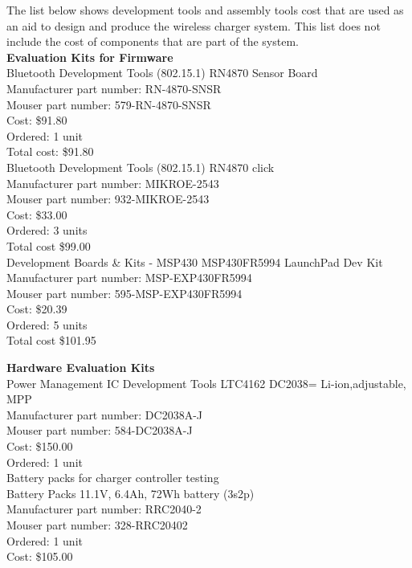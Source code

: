 \documentclass[12pt]{article}
\begin{document}
\indent \indent
The list below shows development tools and assembly tools cost that are used as an aid to design and produce the wireless charger system. This list does not include the cost of components that are part of the system.\\

\noindent
\textbf{Evaluation Kits for Firmware}\\

\noindent
Bluetooth Development Tools (802.15.1) RN4870 Sensor Board \\
Manufacturer part number: RN-4870-SNSR\\
Mouser part number: 579-RN-4870-SNSR\\
Cost: \$91.80\\
Ordered: 1 unit\\
Total cost: \$91.80\\

\noindent 
Bluetooth Development Tools (802.15.1) RN4870 click\\
Manufacturer part number: MIKROE-2543\\
Mouser part number: 932-MIKROE-2543\\
Cost: \$33.00\\
Ordered: 3 units\\
Total cost \$99.00\\

\noindent
Development Boards \& Kits - MSP430 MSP430FR5994 LaunchPad Dev Kit\\
Manufacturer part number: MSP-EXP430FR5994\\
Mouser part number: 595-MSP-EXP430FR5994\\
Cost: \$20.39\\
Ordered: 5 units\\
Total cost \$101.95

\hfill
\pagebreak
\hfill

\noindent
\textbf{Hardware Evaluation Kits}\\

\noindent
Power Management IC Development Tools LTC4162 DC2038= Li-ion,adjustable, MPP\\
Manufacturer part number: DC2038A-J\\
Mouser part number: 584-DC2038A-J\\
Cost: \$150.00\\
Ordered: 1 unit\\

\noindent
Battery packs for charger controller testing\\
Battery Packs 11.1V, 6.4Ah, 72Wh battery (3s2p)\\
Manufacturer part number: RRC2040-2\\
Mouser part number: 328-RRC20402\\
Ordered: 1 unit\\
Cost: \$105.00\\
\end{document}
